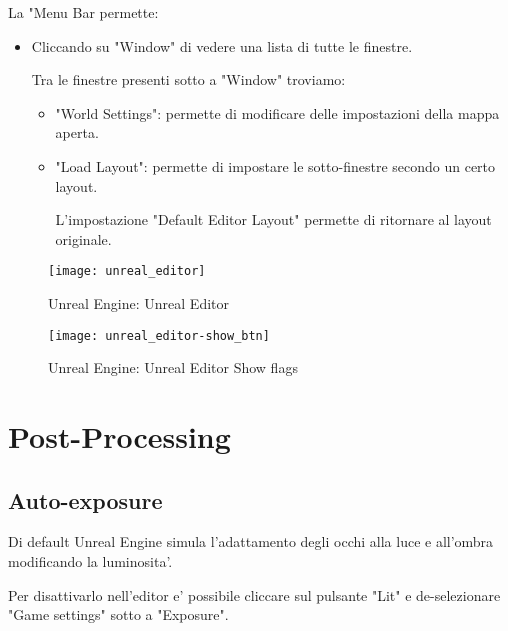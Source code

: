             La "Menu Bar permette:
            \begin{itemize}
                \item Cliccando su "Window" di vedere una lista di tutte le finestre.

                    Tra le finestre presenti sotto a "Window" troviamo:
                    \begin{itemize}
                        \item "World Settings": permette di modificare delle impostazioni della mappa aperta.
                        \item "Load Layout": permette di impostare le sotto-finestre secondo un certo layout.

                                L'impostazione "Default Editor Layout" permette di ritornare al layout originale.

                    \end{itemize}
            \end{itemize}



        \begin{figure}[h]
            \caption{Unreal Engine: Unreal Editor}
            \centering
            \texttt{[image: unreal\_editor]}
            \label{fig:unreal_editor}
        \end{figure}

        \begin{figure}[h]
            \caption{Unreal Engine: Unreal Editor Show flags}
            \centering
            \texttt{[image: unreal\_editor-show\_btn]}
            \label{fig:unreal_editor_show_btn}
        \end{figure}

    \section{Post-Processing}

        \subsection{Auto-exposure}
            Di default Unreal Engine simula l'adattamento degli occhi alla luce e all'ombra modificando la luminosita'.

            Per disattivarlo nell'editor e' possibile cliccare sul pulsante "Lit" e de-selezionare "Game settings" sotto a "Exposure".

